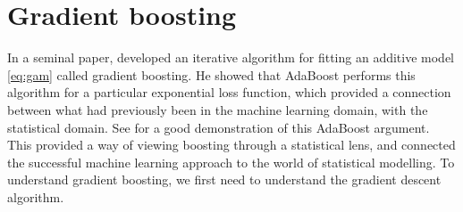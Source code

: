 \section{Gradient boosting}
In a seminal paper, \citet{friedman2001} developed an iterative algorithm for fitting an additive model \eqref{eq:gam} called gradient boosting. He showed that AdaBoost performs this algorithm for a particular exponential loss function, which provided a connection between what had previously been in the machine learning domain, with the statistical domain. See \citet{ESL} for a good demonstration of this AdaBoost argument. This provided a way of viewing boosting through a statistical lens, and connected the successful machine learning approach to the world of statistical modelling. To understand gradient boosting, we first need to understand the gradient descent algorithm.

